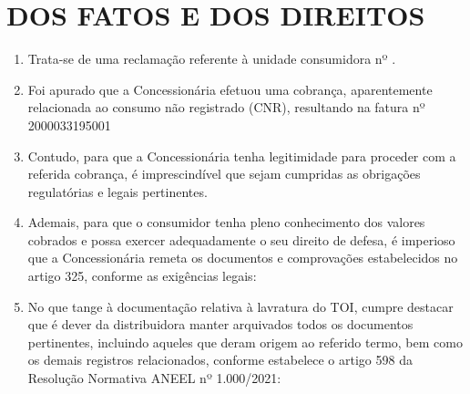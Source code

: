 \newcommand{\tipoRequerimento}{Defesa de TOI}

\section{DOS FATOS E DOS DIREITOS}

\begin{enumerate}[resume]
\item Trata-se de uma reclamação referente à unidade consumidora nº \unidadeConsumidora{}.
\item Foi apurado que a Concessionária efetuou uma cobrança, aparentemente relacionada ao consumo não registrado (CNR), resultando na fatura nº 2000033195001 %
\item Contudo, para que a Concessionária tenha legitimidade para proceder com a referida cobrança, é imprescindível que sejam cumpridas as obrigações regulatórias e legais pertinentes.
\item Ademais, para que o consumidor tenha pleno conhecimento dos valores cobrados e possa exercer adequadamente o seu direito de defesa, é imperioso que a Concessionária remeta os documentos e comprovações estabelecidos no artigo 325, conforme as exigências legais:


\item No que tange à documentação relativa à lavratura do TOI, cumpre destacar que é dever da distribuidora manter arquivados todos os documentos pertinentes, incluindo aqueles que deram origem ao referido termo, bem como os demais registros relacionados, conforme estabelece o artigo 598 da Resolução Normativa ANEEL nº 1.000/2021:

\end{enumerate}
